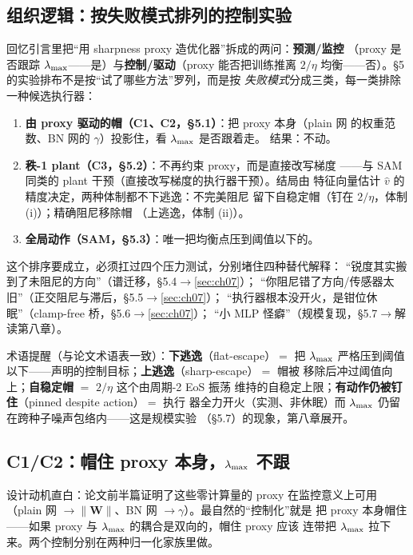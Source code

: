 \subsection{组织逻辑：按失败模式排列的控制实验}
\label{sec:ch05-organization}

回忆引言里把``用 sharpness proxy 造优化器''拆成的两问：\textbf{预测/监控}
（proxy 是否跟踪 $\lambda_{\max}$——是）与\textbf{控制/驱动}（proxy 能否把训练推离
$2/\eta$ 均衡——否）。§5 的实验排布不是按``试了哪些方法''罗列，而是按
\emph{失败模式}分成三类，每一类排除一种候选执行器：

\begin{enumerate}
  \item \textbf{由 proxy 驱动的帽（C1、C2，§5.1）}：把 proxy 本身（plain 网
        的权重范数、BN 网的 $\gamma$）投影住，看 $\lambda_{\max}$ 是否跟着走。
        结果：不动。
  \item \textbf{秩-1 plant（C3，§5.2）}：不再约束 proxy，而是直接改写梯度
        ——与 SAM 同类的 plant 干预（直接改写梯度的执行器干预）。结局由
        特征向量估计 $\hat v$ 的精度决定，两种体制都不下逃逸：不完美阻尼
        留下自稳定帽（钉在 $2/\eta$，体制 (i)）；精确阻尼移除帽
        （上逃逸，体制 (ii)）。
  \item \textbf{全局动作（SAM，§5.3）}：唯一把均衡点压到阈值以下的。
\end{enumerate}

这个排序要成立，必须扛过四个压力测试，分别堵住四种替代解释：
``锐度其实搬到了未阻尼的方向''（谱迁移，§5.4$\to$\ref{sec:ch07}）；
``你阻尼错了方向/传感器太旧''（正交阻尼与滞后，§5.5$\to$\ref{sec:ch07}）；
``执行器根本没开火，是钳位休眠''（clamp-free 桥，§5.6$\to$\ref{sec:ch07}）；
``小 MLP 怪癖''（规模复现，§5.7$\to$解读第八章）。

术语提醒（与论文术语表一致）：\textbf{下逃逸}（flat-escape）$=$ 把 $\lambda_{\max}$
严格压到阈值以下——声明的控制目标；\textbf{上逃逸}（sharp-escape）$=$ 帽被
移除后冲过阈值向上；\textbf{自稳定帽} $=$ $2/\eta$ 这个由周期-2 EoS 振荡
维持的自稳定上限；\textbf{有动作仍被钉住}（pinned despite action）$=$ 执行
器全力开火（实测、非休眠）而 $\lambda_{\max}$ 仍留在跨种子噪声包络内——这是规模实验
（§5.7）的现象，第八章展开。

\subsection{C1/C2：帽住 proxy 本身，$\lambda_{\max}$ 不跟}
\label{sec:ch05-normcaps}

设计动机直白：论文前半篇证明了这些零计算量的 proxy 在监控意义上可用
（plain 网 $\to\|\mathbf{W}\|$、BN 网 $\to\gamma$）。最自然的``控制化''就是
把 proxy 本身帽住——如果 proxy 与 $\lambda_{\max}$ 的耦合是双向的，帽住 proxy 应该
连带把 $\lambda_{\max}$ 拉下来。两个控制分别在两种归一化家族里做。

